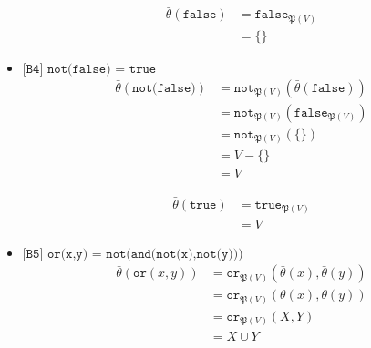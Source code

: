 \documentclass[a4paper,11pt]{article}
\begin{document}
\begin{itemize}
\begin{align*}
\bar \theta(\texttt{false}) &= \texttt{false}_{\mathfrak{P}(V)} \\
                            &= \{\}
\end{align*}

\item{$\texttt{[B4] not(false) = true}$}
\begin{align*}
\bar \theta(\texttt{not(false)}) &= \texttt{not}_{\mathfrak{P}(V)}(\bar \theta(\texttt{false})) \\
                                 &= \texttt{not}_{\mathfrak{P}(V)}(\texttt{false}_{\mathfrak{P}(V)}) \\
                                 &= \texttt{not}_{\mathfrak{P}(V)}(\{\}) \\
                                 &= V - \{\} \\
                                 &= V
\end{align*}

\begin{align*}
\bar \theta(\texttt{true}) &= \texttt{true}_{\mathfrak{P}(V)} \\
                           &= V
\end{align*}

\item{$\texttt{[B5] or(x,y) = not(and(not(x),not(y)))}$}
\begin{align*}
\bar \theta(\texttt{or}(x,y)) &= \texttt{or}_{\mathfrak{P}(V)}(\bar \theta(x), \bar \theta(y)) \\
                              &= \texttt{or}_{\mathfrak{P}(V)}(\theta(x), \theta(y)) \\
                              &= \texttt{or}_{\mathfrak{P}(V)}(X,Y) \\
                              &= X \cup Y
\end{align*}


\end{itemize}
\end{document}

